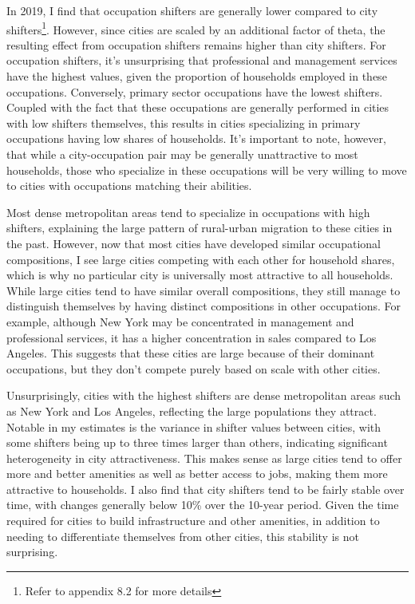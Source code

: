 \documentclass[10pt]{article}
\begin{document}


In 2019, I find that occupation shifters are generally lower compared to city shifters\footnote{Refer to appendix 8.2 for more details}. However, since cities are scaled by an additional factor of theta, the resulting effect from occupation shifters remains higher than city shifters. For occupation shifters, it's unsurprising that professional and management services have the highest values, given the proportion of households employed in these occupations. Conversely, primary sector occupations have the lowest shifters. Coupled with the fact that these occupations are generally performed in cities with low shifters themselves, this results in cities specializing in primary occupations having low shares of households. It's important to note, however, that while a city-occupation pair may be generally unattractive to most households, those who specialize in these occupations will be very willing to move to cities with occupations matching their abilities.

Most dense metropolitan areas tend to specialize in occupations with high shifters, explaining the large pattern of rural-urban migration to these cities in the past. However, now that most cities have developed similar occupational compositions, I see large cities competing with each other for household shares, which is why no particular city is universally most attractive to all households. While large cities tend to have similar overall compositions, they still manage to distinguish themselves by having distinct compositions in other occupations. For example, although New York may be concentrated in management and professional services, it has a higher concentration in sales compared to Los Angeles. This suggests that these cities are large because of their dominant occupations, but they don't compete purely based on scale with other cities.

Unsurprisingly, cities with the highest shifters are dense metropolitan areas such as New York and Los Angeles, reflecting the large populations they attract. Notable in my estimates is the variance in shifter values between cities, with some shifters being up to three times larger than others, indicating significant heterogeneity in city attractiveness. This makes sense as large cities tend to offer more and better amenities as well as better access to jobs, making them more attractive to households. I also find that city shifters tend to be fairly stable over time, with changes generally below 10\% over the 10-year period. Given the time required for cities to build infrastructure and other amenities, in addition to needing to differentiate themselves from other cities, this stability is not surprising.
\end{document}
